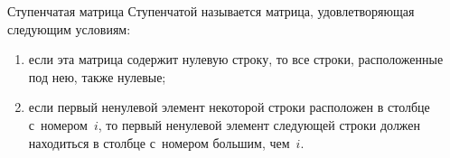 \documentclass[unicode,11pt,notheorems]{beamer}
\begin{document}
\begin{frame}{Ступенчатая матрица}{}
	\alert{Ступенчатой} называется матрица, удовлетворяющая следующим условиям:
	\begin{enumerate}
	\item 
	    если эта матрица содержит нулевую строку, то все строки, расположенные под нею, также нулевые;
    \item 
	    если первый ненулевой элемент некоторой строки расположен в столбце с~номером~$i$, то первый ненулевой элемент следующей строки должен находиться в столбце с~номером большим, чем~$i$.
	\end{enumerate}
	
	\begin{tikzpicture}
	
	\end{tikzpicture}

\end{frame}

%
\end{document}
